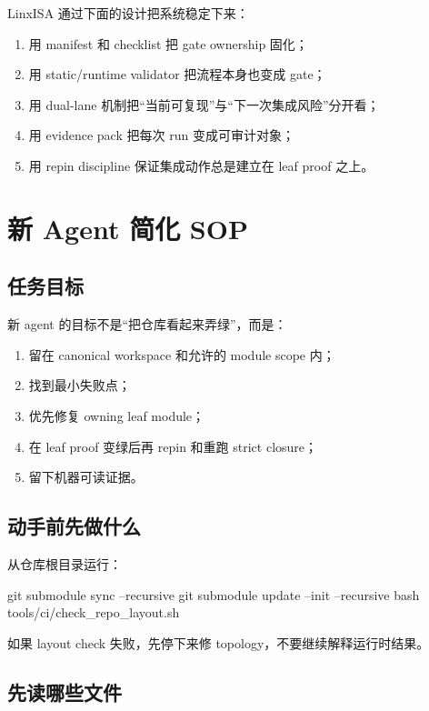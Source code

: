 \documentclass[UTF8,11pt,a4paper]{ctexart}
\begin{document}
LinxISA 通过下面的设计把系统稳定下来：

\begin{enumerate}
  \item 用 manifest 和 checklist 把 gate ownership 固化；
  \item 用 static/runtime validator 把流程本身也变成 gate；
  \item 用 dual-lane 机制把“当前可复现”与“下一次集成风险”分开看；
  \item 用 evidence pack 把每次 run 变成可审计对象；
  \item 用 repin discipline 保证集成动作总是建立在 leaf proof 之上。
\end{enumerate}

\section{新 Agent 简化 SOP}

\subsection{任务目标}

新 agent 的目标不是“把仓库看起来弄绿”，而是：

\begin{enumerate}
  \item 留在 canonical workspace 和允许的 module scope 内；
  \item 找到最小失败点；
  \item 优先修复 owning leaf module；
  \item 在 leaf proof 变绿后再 repin 和重跑 strict closure；
  \item 留下机器可读证据。
\end{enumerate}

\subsection{动手前先做什么}

从仓库根目录运行：

\begin{CodeBlock}
git submodule sync --recursive
git submodule update --init --recursive
bash tools/ci/check_repo_layout.sh
\end{CodeBlock}

如果 layout check 失败，先停下来修 topology，不要继续解释运行时结果。

\subsection{先读哪些文件}
\end{document}
